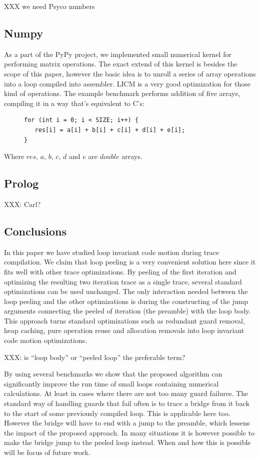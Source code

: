 \documentclass[preprint]{sigplanconf}
\begin{document}
XXX we need Psyco numbers

\subsection{Numpy}

As a part of the PyPy project, we implemented small numerical kernel for
performing matrix operations. The exact extend of this kernel is besides
the scope of this paper, however the basic idea is to unroll a series of
array operations into a loop compiled into assembler. LICM is a very good
optimization for those kind of operations. The example benchmark performs
addition of five arrays, compiling it in a way that's equivalent to C's:

\begin{figure}
\begin{lstlisting}[mathescape,basicstyle=\setstretch{1.05}\ttfamily\scriptsize]
for (int i = 0; i < SIZE; i++) {
   res[i] = a[i] + b[i] + c[i] + d[i] + e[i];
}
\end{lstlisting}
\end{figure}

Where $res$, $a$, $b$, $c$, $d$ and $e$ are $double$ arrays. 

\subsection{Prolog}
XXX: Carl?

\subsection{Conclusions}
In this paper we have studied loop invariant code motion during trace
compilation. We claim that loop peeling is a very convenient solution
here since it fits well with other trace optimizations. By peeling of
the first iteration and optimizing the resulting two iteration trace
as a single trace, several standard optimizations can be 
used unchanged. The only interaction needed between the loop peeling
and the other 
optimizations is during the constructing of the jump arguments
connecting the peeled of iteration (the preamble) with the loop body. This
approach 
turns standard optimizations such as redundant guard removal, heap
caching, pure operation reuse and allocation removals into loop
invariant code motion optimizations.

XXX: is ``loop body'' or ``peeled loop'' the preferable term?

By using several benchmarks we show that the proposed algorithm can
significantly
improve the run time of small loops containing numerical
calculations. 
At least in cases where there are not too many guard
failures. The standard way of handling guards that fail often is to 
trace a bridge from it back to the start of some previously compiled
loop. This is applicable here too. However the bridge will have to end
with a jump to the preamble, which lessens the impact of the 
proposed approach.
In many situations it is however possible to make the bridge
jump to the peeled loop instead. When and how this is possible will be
focus of future work.
\end{document}
